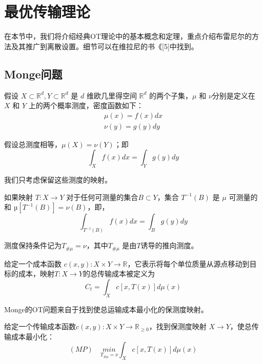 
\section{最优传输理论}

在本节中，我们将介绍经典OT理论中的基本概念和定理，重点介绍布雷尼尔的方法及其推广到离散设置。细节可以在维拉尼的书《[5]中找到。

\subsection{Monge问题}

假设 $X \subset \mathbb{R}^d, Y \subset \mathbb{R}^d $ 是 $ d $ 维欧几里得空间 $ \mathbb{R}^d $ 的两个子集，$\mu$ 和 $\nu$分别是定义在 $X$ 和 $Y$ 上的两个概率测度，密度函数如下：
\begin{equation*}
	\begin{array}{c} 
		\mu(x) =f(x)dx \\ 
		\nu (y) =g(y)dy 
	\end{array}
\end{equation*}

假设总测度相等，$\mu(X)=\nu(Y)$；即
\begin{equation}
	\int_X f(x)dx =\int_Y g(y)dy
	\label{function:1}
\end{equation}

我们只考虑保留这些测度的映射。

\begin{definition}[保留测度映射]
	如果映射 $T: X \to Y $ 对于任何可测量的集合$B \subset Y $，集合 $T^{-1}(B)$ 是 $\mu$ 可测量的和 $µ[T^{-1}(B)]=\nu(B)$，即，
	\begin{equation}
		\int_{T^{-1}(B)} f(x)dx =\int_B g(y)dy
		\label{function:2}
	\end{equation}

	测度保持条件记为$T_{\# \mu}=\nu$，其中$T_{\#\mu}$ 是由$T$诱导的推向测度。
	\label{def:3.1}
\end{definition}

给定一个成本函数 $c(x,y): X \times Y \to \mathbb{R} $，它表示将每个单位质量从源点移动到目标的成本，映射$T: X \to Y$的总传输成本被定义为
\begin{equation}
	C_t=\int_X c[x,T(x)]d\mu (x) 
	\label{function:3}
\end{equation}

Monge的OT问题来自于找到使总运输成本最小化的保测度映射。

\begin{problem}[蒙日【43】;MP]
	给定一个传输成本函数$c(x,y): X \times Y\to\mathbb{R}_{\ge 0}$，找到保测度映射 $X \to Y$，使总传输成本最小化：
	\begin{equation}
		(MP) \quad \underset{T_{\# \mu}=\nu}{min} \int_X c[x,T(x)]d\mu(x)  
		\label{function:4}
	\end{equation}
	\label{problem:3.1}
\end{problem}

